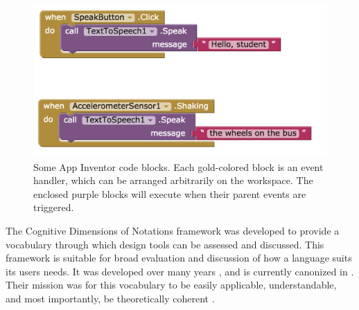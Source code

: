 \begin{figure}
  \centering
      \includegraphics[width=\textwidth]{images/debugActivity/debug0start}
  \caption[Some App Inventor code blocks]{Some App Inventor code blocks. Each gold-colored block is an event handler, which can be arranged arbitrarily on the workspace. The enclosed purple blocks will execute when their parent events are triggered.}
  \label{fig:debug0ch2}
\end{figure}


\label{sec:CDs}
The Cognitive Dimensions of Notations framework was developed to provide a vocabulary through which design tools can be assessed and discussed. This framework is suitable for broad evaluation and discussion of how a language suits its users needs. It was developed over many years \citep{green1989cognitive, green1996usability}, and is currently canonized in \citet{blackwell-2003}. Their mission was for this vocabulary to be easily applicable, understandable, and most importantly, be theoretically coherent \citep{petre-2006}. 



